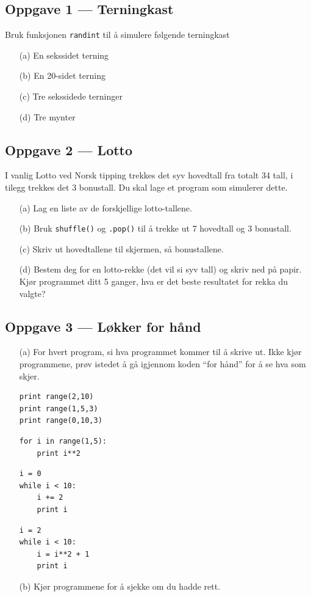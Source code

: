 \documentclass[a4paper, 11pt, notitlepage]{article}
\begin{document}
\subsection*{Oppgave 1 --- Terningkast}
Bruk funksjonen \verb+randint+ til å simulere følgende terningkast
\begin{itemize}
	\item[(a)] En sekssidet terning
	\item[(b)] En 20-sidet terning
	\item[(c)] Tre sekssidede terninger
	\item[(d)] Tre mynter
\end{itemize}

\subsection*{Oppgave 2 --- Lotto}

I vanlig Lotto ved Norsk tipping trekkes det syv hovedtall fra totalt 34 tall, i tilegg trekkes det 3 bonustall. Du skal lage et program som simulerer dette.

\begin{itemize}
	\item[(a)] Lag en liste av de forskjellige lotto-tallene.
	\item[(b)] Bruk \verb+shuffle()+ og \verb+.pop()+ til å trekke ut 7 hovedtall og 3 bonustall.
	\item[(c)] Skriv ut hovedtallene til skjermen, så bonustallene.
	\item[(d)] Bestem deg for en lotto-rekke (det vil si syv tall) og skriv ned på papir. Kjør programmet ditt 5 ganger, hva er det beste resultatet for rekka du valgte?
\end{itemize}

\subsection*{Oppgave 3 --- Løkker for hånd}

\begin{itemize}
	\item[(a)] For hvert program, si hva programmet kommer til å skrive ut. Ikke kjør programmene, prøv istedet å gå igjennom koden ``for hånd'' for å se hva som skjer.
\begin{lstlisting}
print range(2,10)
print range(1,5,3)
print range(0,10,3)
\end{lstlisting}
\begin{lstlisting}
for i in range(1,5):
	print i**2
\end{lstlisting}
\begin{lstlisting}
i = 0
while i < 10:
	i += 2
	print i
\end{lstlisting}
\begin{lstlisting}
i = 2
while i < 10:
	i = i**2 + 1
	print i
\end{lstlisting}
\item[(b)] Kjør programmene for å sjekke om du hadde rett.
\end{itemize}
\end{document}
